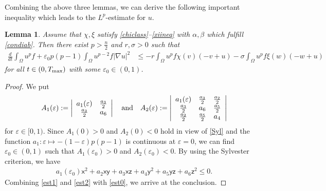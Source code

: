 \documentclass[12pt,reqno,draft]{article}
\numberwithin{equation}{section}
\theoremstyle{theorem}
\newtheorem{lem}[thm]{Lemma}
\theoremstyle{definition}
\newcommand{\ep}{\varepsilon}
\newcommand{\Tmax}{T_{\rm max}}
\begin{document}
Combining the above three lemmas, 
we can derive the following important inequality 
which leads to the $L^p$-estimate for $u$. 
%
\begin{lem} \label{DIupf2}
 Assume that $\chi, \xi$ satisfy \eqref{chiclass}--\eqref{xiineq} with 
 $\alpha, \beta$ which fulfill \eqref{condiab}. 
 Then there exist $p>\frac{n}{2}$ and $r, \sigma>0$ 
 such that
%
    \begin{align*}
            \frac{d}{dt}\int_\Omega u^pf
            +\ep_0 p(p-1)\int_\Omega u^{p-2}f|\nabla u|^2
        &\le
            -r\int_\Omega u^pf\chi(v)(-v+u)
            -\sigma\int_\Omega u^pf\xi(w)(-w+u)
    \end{align*}
% 
for all $t \in (0, \Tmax)$ with some $\ep_0 \in (0,1)$.
\end{lem}
%
%
\begin{proof}
We put
%
    \begin{align*}%
             A_1(\ep):=\left|
                    \begin{array}{cc}
                                   a_1(\ep) & \frac{a_3}{2}
                    \\
                        \frac{a_3}{2} & a_6
                    \end{array}
                    \right|
    \quad
             {\rm and}
    \quad
             A_2(\ep):=\left|
                    \begin{array}{ccc}
                                   a_1(\ep) & \frac{a_3}{2} & \frac{a_2}{2}
                    \\
                        \frac{a_3}{2} &            a_6 & \frac{a_5}{2}
                    \\
                        \frac{a_2}{2} & \frac{a_5}{2} &            a_4
                    \end{array}
                    \right|
    \end{align*}
% 
 for $\ep \in [0, 1)$. 
 Since $A_1(0)>0$ and $A_2(0)<0$ hold in view of \eqref{Syl} and 
 the function $a_1 \colon \ep \mapsto -(1-\ep)p(p-1)$ is continuous at 
 $\ep=0$, 
 we can find $\ep_0 \in (0,1)$ such that $A_1(\ep_0)>0$ and $A_2(\ep_0)<0$. 
 By using the Sylvester criterion, we have 
\begin{align}\label{est2}
a_1(\ep_0) \textsf{x}^2+a_2 \textsf{xy}+a_3 \textsf{xz}+a_4 \textsf{y}^2
+a_5 \textsf{yz}+a_6 \textsf{z}^2 \le 0.
\end{align}
Combining \eqref{est1} and \eqref{est2} with \eqref{est0}, 
we arrive at the conclusion.
\end{proof}
\end{document}
